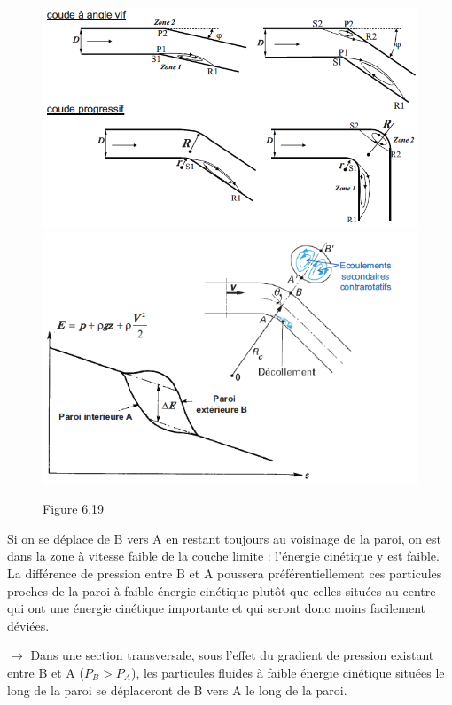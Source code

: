 \begin{figure}[H]
\begin{center}
\includegraphics[scale=0.40]{ch6/80.png}
\\
\includegraphics[scale=0.40]{ch6/81.png}
\caption*{Figure 6.19}
\end{center}
\end{figure}

Si on se déplace de B vers A en restant toujours au voisinage de la paroi, on est dans la zone à vitesse faible de la couche limite : l’énergie cinétique y est faible. La différence de pression entre B et A poussera préférentiellement ces particules proches de la paroi à faible énergie cinétique plutôt que celles situées au centre qui ont une énergie cinétique importante et qui seront donc moins facilement déviées.

$\rightarrow$ Dans une section transversale, sous l’effet du gradient de pression existant entre B et A ($P_B > P_A$), les particules fluides à faible énergie cinétique situées le long de la paroi se déplaceront de B vers A le long de la paroi.

